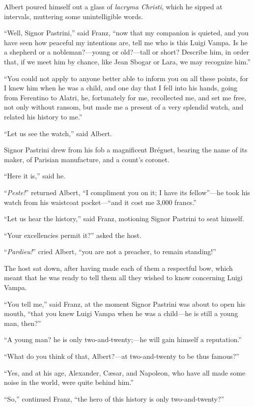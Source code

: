 Albert poured himself out a glass of \textit{lacryma Christi}, which he sipped
at intervals, muttering some unintelligible words.

“Well, Signor Pastrini,” said Franz, “now that my companion is quieted,
and you have seen how peaceful my intentions are, tell me who is this
Luigi Vampa. Is he a shepherd or a nobleman?—young or old?—tall or
short? Describe him, in order that, if we meet him by chance, like Jean
Sbogar or Lara, we may recognize him.”

“You could not apply to anyone better able to inform you on all these
points, for I knew him when he was a child, and one day that I fell
into his hands, going from Ferentino to Alatri, he, fortunately for me,
recollected me, and set me free, not only without ransom, but made me a
present of a very splendid watch, and related his history to me.”

“Let us see the watch,” said Albert.

Signor Pastrini drew from his fob a magnificent Bréguet, bearing the
name of its maker, of Parisian manufacture, and a count’s coronet.

“Here it is,” said he.

“\textit{Peste!}” returned Albert, “I compliment you on it; I have its
fellow”—he took his watch from his waistcoat pocket—“and it cost me
3,000 francs.”

“Let us hear the history,” said Franz, motioning Signor Pastrini to
seat himself.

“Your excellencies permit it?” asked the host.

“\textit{Pardieu!}” cried Albert, “you are not a preacher, to remain
standing!”

The host sat down, after having made each of them a respectful bow,
which meant that he was ready to tell them all they wished to know
concerning Luigi Vampa.

“You tell me,” said Franz, at the moment Signor Pastrini was about to
open his mouth, “that you knew Luigi Vampa when he was a child—he is
still a young man, then?”

“A young man? he is only two-and-twenty;—he will gain himself a
reputation.”

“What do you think of that, Albert?—at two-and-twenty to be thus
famous?”

“Yes, and at his age, Alexander, Cæsar, and Napoleon, who have all made
some noise in the world, were quite behind him.”

“So,” continued Franz, “the hero of this history is only
two-and-twenty?”

